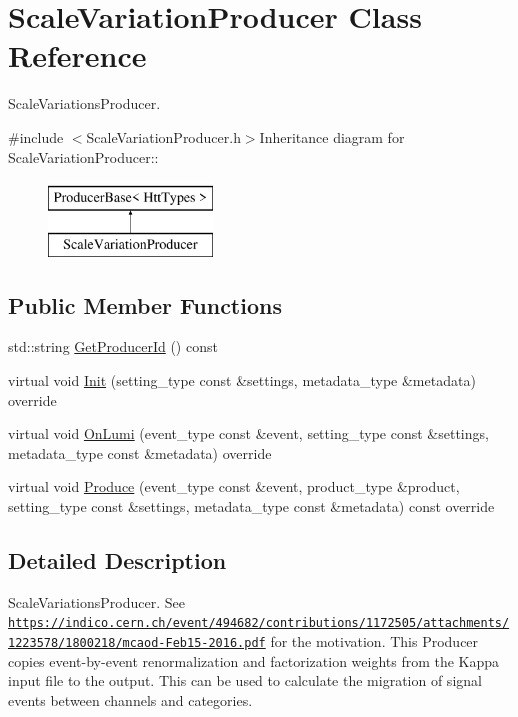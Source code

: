 \hypertarget{classScaleVariationProducer}{
\section{ScaleVariationProducer Class Reference}
\label{classScaleVariationProducer}
}


ScaleVariationsProducer.  


{\ttfamily \#include $<$ScaleVariationProducer.h$>$}Inheritance diagram for ScaleVariationProducer::\begin{figure}[H]
\begin{center}
\leavevmode
\includegraphics[height=2cm]{classScaleVariationProducer}
\end{center}
\end{figure}
\subsection*{Public Member Functions}
\begin{DoxyCompactItemize}
\item 
std::string \hyperlink{classScaleVariationProducer_aaab35f39c99ffe1d15d5fda78c065e26}{GetProducerId} () const 
\item 
virtual void \hyperlink{classScaleVariationProducer_a32faff7a649574b05193c921bebe8542}{Init} (setting\_\-type const \&settings, metadata\_\-type \&metadata) override
\item 
virtual void \hyperlink{classScaleVariationProducer_a8707e303a185f866fb84e990190e2029}{OnLumi} (event\_\-type const \&event, setting\_\-type const \&settings, metadata\_\-type const \&metadata) override
\item 
virtual void \hyperlink{classScaleVariationProducer_a065fd728acd12ae448a7ce1d7088bdae}{Produce} (event\_\-type const \&event, product\_\-type \&product, setting\_\-type const \&settings, metadata\_\-type const \&metadata) const override
\end{DoxyCompactItemize}


\subsection{Detailed Description}
ScaleVariationsProducer. See \href{https://indico.cern.ch/event/494682/contributions/1172505/attachments/1223578/1800218/mcaod-Feb15-2016.pdf}{\tt https://indico.cern.ch/event/494682/contributions/1172505/attachments/1223578/1800218/mcaod-\/Feb15-\/2016.pdf} for the motivation. This Producer copies event-\/by-\/event renormalization and factorization weights from the Kappa input file to the output. This can be used to calculate the migration of signal events between channels and categories. 

